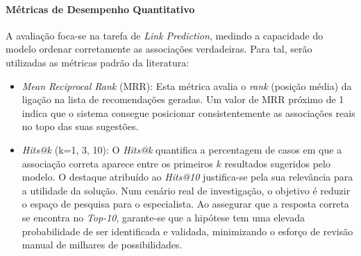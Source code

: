 \paragraph{Métricas de Desempenho Quantitativo}
A avaliação foca-se na tarefa de \emph{Link Prediction}, medindo a capacidade do modelo ordenar corretamente as associações verdadeiras. Para tal, serão utilizadas as métricas padrão da literatura:
\begin{itemize}
    \item \emph{Mean Reciprocal Rank} (MRR): Esta métrica avalia o \emph{rank} (posição média) da ligação na lista de recomendações geradas. Um valor de MRR próximo de 1 indica que o sistema consegue posicionar consistentemente as associações reais no topo das suas sugestões.
    
    \item \emph{Hits@k} (k=1, 3, 10): O \emph{Hits@k} quantifica a percentagem de casos em que a associação correta aparece entre os primeiros $k$ resultados sugeridos pelo modelo. O destaque atribuído ao \emph{Hits@10} justifica-se pela sua relevância para a utilidade da solução. Num cenário real de investigação, o objetivo é reduzir o espaço de pesquisa para o especialista. Ao assegurar que a resposta correta se encontra no \emph{Top-10}, garante-se que a hipótese tem uma elevada probabilidade de ser identificada e validada, minimizando o esforço de revisão manual de milhares de possibilidades.
\end{itemize}

